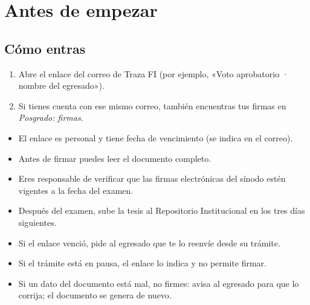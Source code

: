 \section{Antes de empezar}
\subsection*{Cómo entras}
\begin{enumerate}
  \item Abre el enlace del correo de Traza FI (por ejemplo, «Voto aprobatorio · nombre del egresado»).
  \item Si tienes cuenta con ese mismo correo, también encuentras tus firmas en \emph{Posgrado: firmas}.
\end{enumerate}
\begin{tencuenta}
\begin{itemize}
  \item El enlace es personal y tiene fecha de vencimiento (se indica en el correo).
  \item Antes de firmar puedes leer el documento completo.
  \item Eres responsable de verificar que las firmas electrónicas del sínodo estén vigentes a la fecha del examen.
  \item Después del examen, sube la tesis al Repositorio Institucional en los tres días siguientes.
\end{itemize}
\end{tencuenta}
\begin{algosalemal}
\begin{itemize}
  \item Si el enlace venció, pide al egresado que te lo reenvíe desde su trámite.
  \item Si el trámite está en pausa, el enlace lo indica y no permite firmar.
  \item Si un dato del documento está mal, no firmes: avisa al egresado para que lo corrija; el documento se genera de nuevo.
\end{itemize}
\end{algosalemal}
